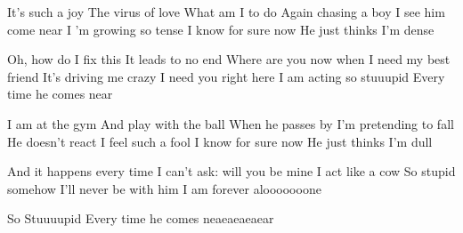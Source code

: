 \begin{verse*}
It's such a joy
The virus of love
What am I to do
Again chasing a boy
I see him come near
I 'm growing so tense
I know for sure now
He just thinks I'm dense
\end{verse*}

\begin{chorus}
Oh, how do I fix this
It leads to no end
Where are you now when I need my best friend
It's driving me crazy
I need you right here
I am acting so stuuupid
Every time he comes near
\end{chorus}

\begin{verse*}
I am at the gym
And play with the ball
When he passes by
I'm pretending to fall
He doesn't react
I feel such a fool
I know for sure now
He just thinks I'm dull
\end{verse*}

\thechorus

\begin{verse*}
And it happens every time
I can't ask: will you be mine
I act like a cow
So stupid somehow
I'll never be with him
I am forever alooooooone
\end{verse*}

\thechorus[2]

\begin{verse*}
So Stuuuupid
Every time he comes neaeaeaeaear
\end{verse*}
